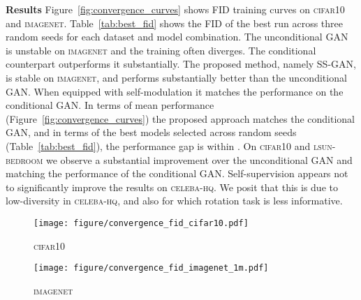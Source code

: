 \documentclass[10pt,twocolumn,letterpaper]{article}
\newcommand{\celebahq}{\textsc{celeba-hq}}
\newcommand{\lsun}{\textsc{lsun-bedroom}}
\newcommand{\cifar}{\textsc{cifar10}}
\newcommand{\imagenet}{\textsc{imagenet}}
\begin{document}
\vspace{2mm}
\noindent\textbf{Results}\quad
Figure~\ref{fig:convergence_curves} shows FID training curves on \cifar{} and \imagenet{}.
Table~\ref{tab:best_fid} shows the FID of the best run across three random seeds for each dataset and model combination. The unconditional GAN is unstable on \imagenet{} and the training often diverges. The conditional counterpart outperforms it substantially. The proposed method, namely SS-GAN, is stable on \imagenet{}, and performs substantially better than the unconditional GAN. When equipped with self-modulation it matches the performance on the conditional GAN.
In terms of mean performance (Figure~\ref{fig:convergence_curves}) the proposed approach matches the conditional GAN, and in terms of the best models selected across random seeds (Table~\ref{tab:best_fid}), the performance gap is within . On \cifar{} and \lsun{} we observe a substantial improvement over the unconditional GAN and matching the performance of the conditional GAN. Self-supervision appears not to significantly improve the results on \celebahq{}. We posit that this is due to low-diversity in \celebahq{}, and also for which rotation task is less informative.


\begin{figure*}[ht]
 \centering
 \begin{subfigure}[b]{0.425\textwidth}
    \texttt{[image: figure/convergence\_fid\_cifar10.pdf]}
    \caption{\cifar{}}
 \end{subfigure}
 \begin{subfigure}[b]{0.425\textwidth}
    \texttt{[image: figure/convergence\_fid\_imagenet\_1m.pdf]}
    \caption{\imagenet{}}
 \end{subfigure}\hfill
 \caption{\label{fig:convergence_curves}
   FID learning curves on \cifar{} and \imagenet{}.
   The curves show the mean performance across three random seeds.
   The unconditional GAN (Uncond-GAN) attains significantly poorer performance than the conditional GAN (Cond-GAN).
   The unconditional GAN is unstable on \imagenet{} and the runs often diverge after k training iterations.
   The addition of self-supervision (SS-GAN) stabilizes Uncond-GAN and boosts performance.
   Finally, when we add the additional self-modulated Batch Norm (sBN)~\citep{abn} to SS-GAN,
   which mimics generator conditioning in the unconditional setting,
   this unconditional model attains the same mean performance as the conditional GAN.}
\end{figure*}
\end{document}
